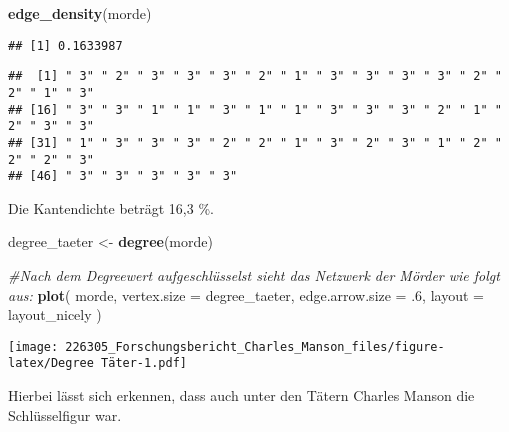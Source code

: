 \documentclass[
]{article}
\newenvironment{Shaded}{\begin{snugshade}}{\end{snugshade}}
\newcommand{\CommentTok}[1]{\textcolor[rgb]{0.56,0.35,0.01}{\textit{#1}}}
\newcommand{\DataTypeTok}[1]{\textcolor[rgb]{0.13,0.29,0.53}{#1}}
\newcommand{\FloatTok}[1]{\textcolor[rgb]{0.00,0.00,0.81}{#1}}
\newcommand{\KeywordTok}[1]{\textcolor[rgb]{0.13,0.29,0.53}{\textbf{#1}}}
\newcommand{\NormalTok}[1]{#1}
\newcommand{\OperatorTok}[1]{\textcolor[rgb]{0.81,0.36,0.00}{\textbf{#1}}}
\newcommand{\StringTok}[1]{\textcolor[rgb]{0.31,0.60,0.02}{#1}}
\begin{document}
\begin{Shaded}
\begin{Highlighting}[]
\KeywordTok{edge_density}\NormalTok{(morde)}
\end{Highlighting}
\end{Shaded}

\begin{verbatim}
## [1] 0.1633987
\end{verbatim}

\begin{Shaded}
\end{Shaded}

\begin{verbatim}
##  [1] " 3" " 2" " 3" " 3" " 3" " 2" " 1" " 3" " 3" " 3" " 3" " 2" " 2" " 1" " 3"
## [16] " 3" " 3" " 1" " 1" " 3" " 1" " 1" " 3" " 3" " 3" " 2" " 1" " 2" " 3" " 3"
## [31] " 1" " 3" " 3" " 3" " 2" " 2" " 1" " 3" " 2" " 3" " 1" " 2" " 2" " 2" " 3"
## [46] " 3" " 3" " 3" " 3" " 3"
\end{verbatim}

Die Kantendichte beträgt 16,3 \%.

\begin{Shaded}
\begin{Highlighting}[]
\NormalTok{degree_taeter <-}\StringTok{ }\KeywordTok{degree}\NormalTok{(morde)}

\CommentTok{#Nach dem Degreewert aufgeschlüsselst sieht das Netzwerk der Mörder wie folgt aus:}
\KeywordTok{plot}\NormalTok{(}
\NormalTok{  morde,}
  \DataTypeTok{vertex.size =}\NormalTok{ degree_taeter,}
  \DataTypeTok{edge.arrow.size =} \FloatTok{.6}\NormalTok{,}
  \DataTypeTok{layout =}\NormalTok{ layout_nicely}
\NormalTok{)}
\end{Highlighting}
\end{Shaded}

\texttt{[image: 226305\_Forschungsbericht\_Charles\_Manson\_files/figure-latex/Degree Täter-1.pdf]}

Hierbei lässt sich erkennen, dass auch unter den Tätern Charles Manson
die Schlüsselfigur war.
\end{document}
